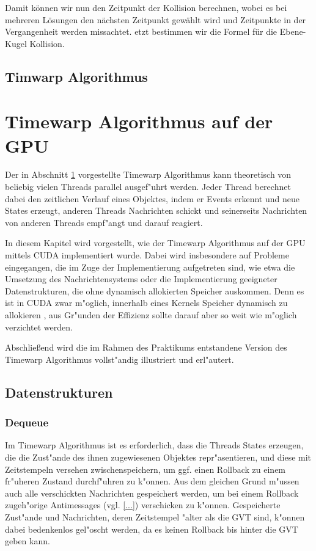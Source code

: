 \documentclass[a4paper, 10pt, openright, parskip, chapterprefix]{scrreprt}
\begin{document}
\noindent Damit können wir nun den Zeitpunkt der Kollision berechnen, wobei es bei mehreren Lösungen den nächsten Zeitpunkt gewählt wird und Zeitpunkte in der Vergangenheit werden missachtet. etzt bestimmen wir die Formel für die Ebene-Kugel Kollision.
\section{Timwarp Algorithmus}
\label{sec:TimewarpAlgoritmus}




\chapter{Timewarp Algorithmus auf der GPU}
Der in Abschnitt \ref{sec:TimewarpAlgoritmus} vorgestellte Timewarp Algorithmus kann theoretisch von beliebig vielen Threads
parallel ausgef"uhrt werden. Jeder Thread berechnet dabei den zeitlichen Verlauf eines Objektes, indem er Events erkennt
und neue States erzeugt, anderen Threads Nachrichten schickt und seinerseits Nachrichten von anderen Threads empf"angt
und darauf reagiert. 

In diesem Kapitel wird vorgestellt, wie der Timewarp Algorithmus auf der GPU mittels CUDA implementiert wurde. Dabei wird
insbesondere auf Probleme eingegangen, die im Zuge der Implementierung aufgetreten sind, wie etwa die Umsetzung des
Nachrichtensystems oder die Implementierung geeigneter Datenstrukturen, die ohne dynamisch allokierten Speicher
auskommen. Denn es ist in CUDA zwar m"oglich, innerhalb eines Kernels Speicher dynamisch zu allokieren \cite{...}, aus
Gr"unden der Effizienz sollte darauf aber so weit wie m"oglich verzichtet werden.

Abschlie\ss end wird die im Rahmen des Praktikums entstandene Version des Timewarp Algorithmus vollst"andig illustriert
und erl"autert.

\section{Datenstrukturen}
\subsection{Dequeue}
Im Timewarp Algorithmus ist es erforderlich, dass die Threads States erzeugen, die die Zust"ande des ihnen zugewiesenen
Objektes repr"asentieren, und diese mit Zeitstempeln versehen zwischenspeichern, um ggf. einen Rollback zu einem
fr"uheren Zustand durchf"uhren zu k"onnen. Aus dem gleichen Grund m"ussen auch alle verschickten Nachrichten gespeichert
werden, um bei einem Rollback zugeh"orige Antimessages (vgl. \ref{...}) verschicken zu k"onnen.
Gespeicherte Zust"ande und Nachrichten, deren Zeitstempel "alter als die GVT sind, k"onnen dabei bedenkenlos gel"oscht
werden, da es keinen Rollback bis hinter die GVT geben kann.
\end{document}
